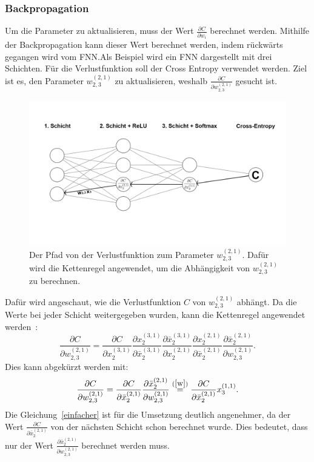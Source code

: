 \documentclass[11pt]{article}
\begin{document}
\subsubsection{Backpropagation}\label{back}
Um die Parameter zu aktualisieren, muss der Wert $\frac{\partial C}{\partial w_{i}}$ berechnet werden. Mithilfe der Backpropagation kann dieser Wert
berechnet werden, indem rückwärts gegangen wird vom FNN.\@ Als Beispiel wird ein FNN dargestellt mit drei Schichten. Für die Verlustfunktion soll der
Cross Entropy verwendet werden. Ziel ist es, den Parameter $w_{2,3}^{(2,1)}$ zu aktualisieren, weshalb $\frac{\partial C}{\partial w_{2,3}^{(2,1)}}$ gesucht ist.
\begin{figure}[h]
    \centering
    \includegraphics[width=400pt, keepaspectratio]{images/beispiel}
    \caption[Beispiel eines FNNs]{Der Pfad von der Verlustfunktion zum Parameter $w_{2,3}^{(2,1)}$. Dafür wird die Kettenregel angewendet, um die Abhängigkeit von $w_{2,3}^{(2,1)}$ zu berechnen.}
\end{figure}
Dafür wird angeschaut, wie die Verlustfunktion $C$ von $w_{2,3}^{(2,1)}$ abhängt.
Da die Werte bei jeder Schicht weitergegeben wurden, kann die Kettenregel angewendet werden~\cite{5}:
\begin{equation}
    \frac{\partial C}{\partial w_{2,3}^{(2,1)}} = \frac{\partial C}{\partial x_2^{(3,1)}} \frac{\partial x_2^{(3,1)}}{\partial \bar{x}_2^{(3,1)}}
    \frac{\partial \bar{x}_2^{(3,1)}}{\partial x_2^{(2,1)}} \frac{\partial x_2^{(2,1)}}{\partial \bar{x}_2^{(2,1)}}
    \frac{\partial \bar{x}_2^{(2,1)}}{\partial w_{2,3}^{(2,1)}}.
\end{equation}
Dies kann abgekürzt werden mit:
\begin{equation}\label{einfacher}
    \frac{\partial C}{\partial w_{2,3}^{(2,1)}} = \frac{\partial C}{\partial \bar{x}_2^{(2,1)}} \frac{\partial \bar{x}_2^{(2,1)}}{\partial w_{2,3}^{(2,1)}} \stackrel{(\ref{w})}{=} \frac{\partial C}{\partial \bar{x}_2^{(2,1)}} x_3^{(1,1)}.
\end{equation}
Die Gleichung~\ref{einfacher} ist für die Umsetzung deutlich angenehmer, da der Wert $\frac{\partial C}{\partial \bar{x}_2^{(2,1)}}$ von der nächsten Schicht
schon berechnet wurde. Dies bedeutet, dass nur der Wert $\frac{\partial \bar{x}_2^{(2,1)}}{\partial w_{2,3}^{(2,1)}}$ berechnet werden muss.
\end{document}
